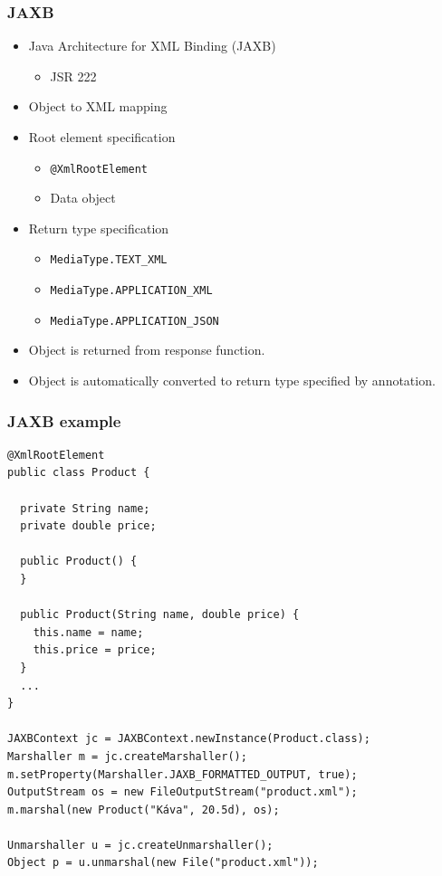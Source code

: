 \documentclass[10pt,xcolor=pdflatex]{beamer}
\begin{document}
\begin{frame}[containsverbatim]\frametitle{JAXB}
\begin{itemize}
    \item Java\texttrademark{} Architecture for XML Binding (JAXB)
      \begin{itemize}
          \item JSR 222
      \end{itemize}
	\item Object to XML mapping
	\item Root element specification
      \begin{itemize}
    	\item \texttt{@XmlRootElement}\\[0.05cm]
        \item Data object
      \end{itemize}
    \item Return type specification
	  \begin{itemize}
		\item \texttt{MediaType.TEXT\_XML}
		\item \texttt{MediaType.APPLICATION\_XML}
		\item \texttt{MediaType.APPLICATION\_JSON}
	  \end{itemize}
    \item Object is returned from response function.
    \item Object is automatically converted to return type specified by annotation.
\end{itemize}
\end{frame}


\begin{frame}[containsverbatim]\frametitle{JAXB example}
\begin{footnotesize}
\begin{verbatim}
@XmlRootElement
public class Product {

  private String name;
  private double price;

  public Product() {
  }

  public Product(String name, double price) {
    this.name = name;
    this.price = price;
  }
  ...
}

JAXBContext jc = JAXBContext.newInstance(Product.class);
Marshaller m = jc.createMarshaller();
m.setProperty(Marshaller.JAXB_FORMATTED_OUTPUT, true);
OutputStream os = new FileOutputStream("product.xml");
m.marshal(new Product("Káva", 20.5d), os);

Unmarshaller u = jc.createUnmarshaller();
Object p = u.unmarshal(new File("product.xml"));

\end{verbatim}
\end{footnotesize}
\end{frame}
\end{document}
